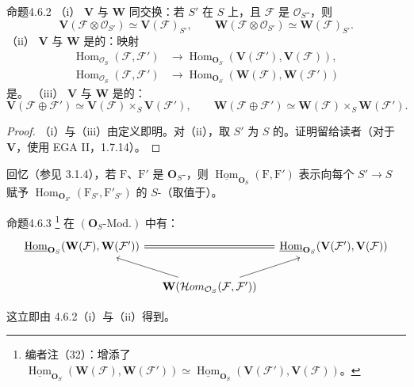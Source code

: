 \begin{SGAresult}{命题}{4.6.2}
（i） $\mathbf V$ 与 $\mathbf W$ 同交换：若 $S'$ 在 $S$ 上，且 $\mathcal F$ 是 $\mathcal O_S$-，则
\[
\mathbf V(\mathcal F\otimes\mathcal O_{S'})\simeq\mathbf V(\mathcal F)_{S'},\qquad\mathbf W(\mathcal F\otimes\mathcal O_{S'})\simeq\mathbf W(\mathcal F)_{S'}.
\]
（ii） $\mathbf V$ 与 $\mathbf W$ 是的：映射
\[
\begin{aligned}
\operatorname{Hom}_{\mathcal O_S}(\mathcal F,\mathcal F')&\longrightarrow\operatorname{Hom}_{\mathbf O_S}(\mathbf V(\mathcal F'),\mathbf V(\mathcal F)),\\
\operatorname{Hom}_{\mathcal O_S}(\mathcal F,\mathcal F')&\longrightarrow\operatorname{Hom}_{\mathbf O_S}(\mathbf W(\mathcal F),\mathbf W(\mathcal F'))
\end{aligned}
\]
是。
（iii） $\mathbf V$ 与 $\mathbf W$ 是的：
\[
\mathbf V(\mathcal F\oplus\mathcal F')\simeq\mathbf V(\mathcal F)\times_S\mathbf V(\mathcal F'),\qquad
\mathbf W(\mathcal F\oplus\mathcal F')\simeq\mathbf W(\mathcal F)\times_S\mathbf W(\mathcal F').
\]
\end{SGAresult}
\begin{proof}
（i）与（iii）由定义即明。对（ii），取 $S'$ 为 $S$ 的。证明留给读者（对于 $\mathbf V$，使用 EGA II，1.7.14）。
\end{proof}
回忆（参见 3.1.4），若 $\mathrm F$、$\mathrm F'$ 是 $\mathbf O_S$-，则 $\underline{\operatorname{Hom}}_{\mathbf O_S}(\mathrm F,\mathrm F')$ 表示向每个 $S'\to S$ 赋予 $\operatorname{Hom}_{\mathbf O_{S'}}(\mathrm F_{S'},\mathrm F'_{S'})$ 的 $S$-（取值于）。

\begin{SGAresult}{命题}{4.6.3}
\footnote{编者注（32）：增添了 $\underline{\operatorname{Hom}}_{\mathbf O_S}(\mathbf W(\mathcal F),\mathbf W(\mathcal F'))\simeq\underline{\operatorname{Hom}}_{\mathbf O_S}(\mathbf V(\mathcal F'),\mathbf V(\mathcal F))$。} 在 $(\mathbf O_S\text{-}\mathrm{Mod.})$ 中有：
\[
\begin{tikzcd}[column sep=small]
\underline{\operatorname{Hom}}_{\mathbf O_S}(\mathbf W(\mathcal F),\mathbf W(\mathcal F'))\arrow[rr,equal]&&\underline{\operatorname{Hom}}_{\mathbf O_S}(\mathbf V(\mathcal F'),\mathbf V(\mathcal F))\\
&\mathbf W(\mathcal{H}om_{\mathcal O_S}(\mathcal F,\mathcal F'))\arrow[ul]\arrow[ur]&
\end{tikzcd}
\]
\end{SGAresult}
这立即由 4.6.2（i）与（ii）得到。

